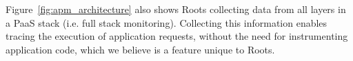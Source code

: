Figure~\ref{fig:apm_architecture} also shows Roots collecting data from all
layers in a 
PaaS stack (i.e. full stack monitoring). 
%
%
Collecting this 
information
enables tracing the execution of application 
requests, without the need for instrumenting application code, which we believe is a feature 
unique to Roots. 


